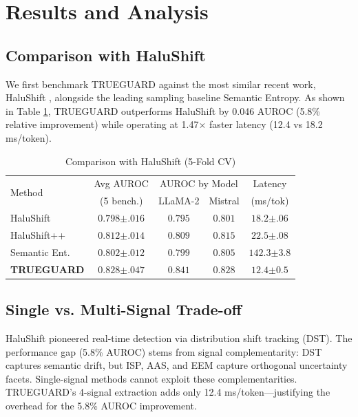 \documentclass[conference]{IEEEtran}
\begin{document}
\section{Results and Analysis}

\subsection{Comparison with HaluShift}
We first benchmark TRUEGUARD against the most similar recent work, HaluShift \cite{dasgupta2025hallushift}, alongside the leading sampling baseline Semantic Entropy. As shown in Table \ref{tab:halushift}, TRUEGUARD outperforms HaluShift by 0.046 AUROC (5.8\% relative improvement) while operating at 1.47$\times$ faster latency (12.4 vs 18.2 ms/token).

\begin{table}[!htbp]
\centering
\caption{Comparison with HaluShift (5-Fold CV)}
\label{tab:halushift}
\begin{tabular}{l|c|cc|c}
\toprule
\multirow{2}{*}{Method} & Avg AUROC & \multicolumn{2}{c|}{AUROC by Model} & Latency \\
& (5 bench.) & LLaMA-2 & Mistral & (ms/tok) \\
\midrule
HaluShift \cite{dasgupta2025hallushift} & $0.798{\scriptstyle \pm.016}$ & $0.795$ & $0.801$ & $18.2{\scriptstyle \pm.06}$ \\
HaluShift++ \cite{nath2025hallushift} & $0.812{\scriptstyle \pm.014}$ & $0.809$ & $0.815$ & $22.5{\scriptstyle \pm.08}$ \\
Semantic Ent. & $0.802{\scriptstyle \pm.012}$ & $0.799$ & $0.805$ & $142.3{\scriptstyle \pm3.8}$ \\
\textbf{TRUEGUARD} & $\mathbf{0.828{\scriptstyle \pm.047}}$ & $\mathbf{0.841}$ & $\mathbf{0.828}$ & $\mathbf{12.4{\scriptstyle \pm0.5}}$ \\
\bottomrule
\end{tabular}
\end{table}

\subsection{Single vs. Multi-Signal Trade-off}
HaluShift pioneered real-time detection via distribution shift tracking (DST). The performance gap (5.8\% AUROC) stems from signal complementarity: DST captures semantic drift, but ISP, AAS, and EEM capture orthogonal uncertainty facets. Single-signal methods cannot exploit these complementarities. TRUEGUARD's 4-signal extraction adds only 12.4 ms/token---justifying the overhead for the 5.8\% AUROC improvement.
\end{document}
